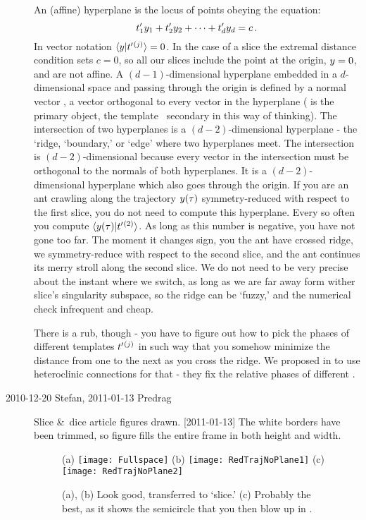 \begin{description}
An (affine) hyperplane is the locus of points obeying the equation:
\[
t'_{1}y_1 + t'_{2}y_2 + \cdots + t'_{d}y_d = c
\,.
\]
In vector notation $\braket{\sspRed}{\sliceTan{}{}^{(j)}}=0$. In the case
of a slice the extremal distance condition sets $c=0$, so all our slices
include the point at the origin, $y=0$, and are not affine. A
$(d\!-\!1)$-dimensional hyperplane embedded in a $d$-dimensional space
and passing through the origin is defined by a normal vector \sliceTan{},
a vector orthogonal to every vector in the hyperplane (\sliceTan{} is the
primary object, the template \slicep\ secondary in this way of thinking).
The intersection of two hyperplanes is a $(d\!-\!2)$-dimensional
hyperplane - the `ridge, `boundary,' or `edge' where two hyperplanes
meet. The intersection is $(d\!-\!2)$-dimensional because every vector in
the intersection must be orthogonal to the normals of both hyperplanes.
It is a $(d\!-\!2)$-dimensional hyperplane which also goes through the
origin. If you are an ant crawling along the trajectory $y(\tau)$
symmetry-reduced with respect to the first slice, you do not need to
compute this hyperplane. Every so often you compute
$\braket{\sspRed(\tau)}{\sliceTan{}{}^{(2)}}$. As long as this number is
negative, you have not gone too far. The moment it changes sign, you the
ant have crossed ridge, we symmetry-reduce with respect to the second
slice, and the ant continues its merry stroll along the second slice. We
do not need to be very precise about the instant where we switch, as long
as we are far away form wither slice's singularity subspace, so the ridge
can be `fuzzy,' and the numerical check infrequent and cheap.

There is a rub, though - you have to figure out how to pick the phases of
different templates $t'_{}{}^{(j)}$ in such way that you somehow
minimize the distance from one to the next as you cross the ridge. We
proposed in  to use heteroclinic connections for that - they
fix the relative phases of different \eqva.

\item[2010-12-20 Stefan, 2011-01-13 Predrag]
Slice \&\ dice article figures drawn. [2011-01-13] The white borders have
been trimmed, so figure fills the entire frame in both height and width.

 \begin{figure}
 (a) \texttt{[image: Fullspace]}%
 (b) \texttt{[image: RedTrajNoPlane1]}%
 (c) \texttt{[image: RedTrajNoPlane2]}%
 \caption{\label{fig:Fullspace}
(a), (b) Look good, transferred to `slice.'
(c) Probably the best, as it shows the semicircle that you then
blow up in .
 }%
 \end{figure}


\end{description}
